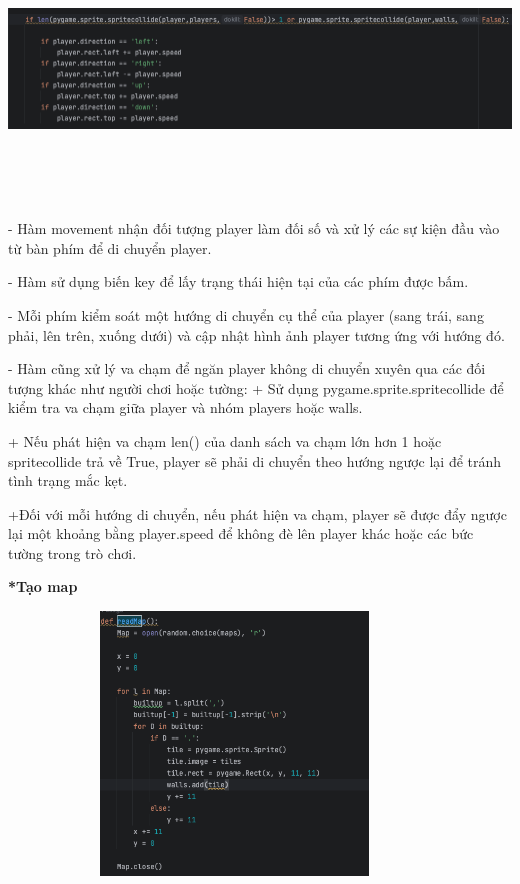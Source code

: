 \documentclass[a4paper]{article}
\begin{document}
         \includegraphics[width=15cm,height=7cm]{movetank2.png}

         - Hàm movement nhận đối tượng player làm đối số và xử lý các sự kiện đầu vào từ bàn phím để di chuyển player.
         
        - Hàm sử dụng biến key để lấy trạng thái hiện tại của các phím được bấm.
        
        - Mỗi phím kiểm soát một hướng di chuyển cụ thể của player (sang trái, sang phải, lên trên, xuống dưới) và cập nhật hình ảnh player tương ứng với hướng đó.
            
        - Hàm cũng xử lý va chạm để ngăn player không di chuyển xuyên qua các đối tượng khác như người chơi hoặc tường:
        + Sử dụng pygame.sprite.spritecollide để kiểm tra va chạm giữa player và nhóm players hoặc walls.

        + Nếu phát hiện va chạm len() của danh sách va chạm lớn hơn 1 hoặc spritecollide trả về True, player sẽ phải di chuyển theo hướng ngược lại để tránh tình trạng mắc kẹt.
        
        +Đối với mỗi hướng di chuyển, nếu phát hiện va chạm, player sẽ được đẩy ngược lại một khoảng bằng player.speed để không đè lên player khác hoặc các bức tường trong trò chơi.

        \textbf{*Tạo map}

        \includegraphics[width=12cm,height=7cm]{readmap.png}
\end{document}
